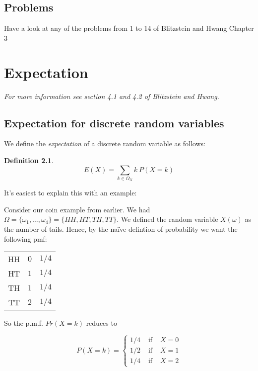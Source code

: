\documentclass[12pt]{extbook}
\newtheorem{df}{Definition}[section]
\begin{document}

\section{Problems}

Have a look at any of the problems from 1 to 14 of Blitzstein and Hwang Chapter 3



\chapter{Expectation}


\textit{For more information see section 4.1 and 4.2 of Blitzstein and Hwang.}

\section{Expectation for discrete random variables}

We define the \emph{expectation} of a discrete random variable as
follows:

\begin{df}
\begin{displaymath}
E(X) = \sum_{k \in \Omega_X} k\ P(X=k)
\end{displaymath}
\end{df}

It's easiest to explain this with an example:


Consider our coin example from earlier.   We had $\Omega = \{\omega_1, \ldots, \omega_4 \} = \{HH, HT, TH, TT\}$.   We defined the random variable $X(\omega)$ as the number of tails.   Hence, by the na\"ive defintion of probability we want the following pmf:

\begin{tabular}{rrr}
HH & $0$ & $1/4$ \\
HT & $1$ & $1/4$ \\
TH & $1$ & $1/4$ \\
TT & $2$ & $1/4$ 
\end{tabular}

So the p.m.f. $Pr(X=k)$ reduces to 

\begin{displaymath}
P(X=k) = \left\{ \begin{array}{rrr} 1/4 & \mbox{ if } & X=0 \\
1/2 & \mbox{ if } & X=1 \\ 1/4 & \mbox{ if } & X = 2 \end{array} \right.
\end{displaymath}
\end{document}
